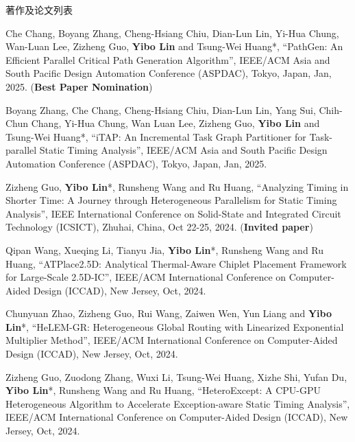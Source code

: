 \begin{rSection}{著作及论文列表}
\begin{description}[font=\normalfont, rightmargin=2em]
\item[{[C168]}]{
        Che Chang, Boyang Zhang, Cheng-Hsiang Chiu, Dian-Lun Lin, Yi-Hua Chung, Wan-Luan Lee, Zizheng Guo, \textbf{Yibo Lin} and Tsung-Wei Huang*, 
    ``PathGen: An Efficient Parallel Critical Path Generation Algorithm'', 
    IEEE/ACM Asia and South Pacific Design Automation Conference (ASPDAC), Tokyo, Japan, Jan, 2025.
    (\textbf{Best Paper Nomination})
}
            

\item[{[C167]}]{
        Boyang Zhang, Che Chang, Cheng-Hsiang Chiu, Dian-Lun Lin, Yang Sui, Chih-Chun Chang, Yi-Hua Chung, Wan Luan Lee, Zizheng Guo, \textbf{Yibo Lin} and Tsung-Wei Huang*, 
    ``iTAP: An Incremental Task Graph Partitioner for Task-parallel Static Timing Analysis'', 
    IEEE/ACM Asia and South Pacific Design Automation Conference (ASPDAC), Tokyo, Japan, Jan, 2025.
    
}
            

\item[{[C166]}]{
        Zizheng Guo, \textbf{Yibo Lin}*, Runsheng Wang and Ru Huang, 
    ``Analyzing Timing in Shorter Time: A Journey through Heterogeneous Parallelism for Static Timing Analysis'', 
    IEEE International Conference on Solid-State and Integrated Circuit Technology (ICSICT), Zhuhai, China, Oct 22-25, 2024.
    (\textbf{Invited paper})
}
            

\item[{[C165]}]{
        Qipan Wang, Xueqing Li, Tianyu Jia, \textbf{Yibo Lin}*, Runsheng Wang and Ru Huang, 
    ``ATPlace2.5D: Analytical Thermal-Aware Chiplet Placement Framework for Large-Scale 2.5D-IC'', 
    IEEE/ACM International Conference on Computer-Aided Design (ICCAD), New Jersey, Oct, 2024.
    
}
            

\item[{[C164]}]{
        Chunyuan Zhao, Zizheng Guo, Rui Wang, Zaiwen Wen, Yun Liang and \textbf{Yibo Lin}*, 
    ``HeLEM-GR: Heterogeneous Global Routing with Linearized Exponential Multiplier Method'', 
    IEEE/ACM International Conference on Computer-Aided Design (ICCAD), New Jersey, Oct, 2024.
    
}
            

\item[{[C163]}]{
        Zizheng Guo, Zuodong Zhang, Wuxi Li, Tsung-Wei Huang, Xizhe Shi, Yufan Du, \textbf{Yibo Lin}*, Runsheng Wang and Ru Huang, 
    ``HeteroExcept: A CPU-GPU Heterogeneous Algorithm to Accelerate Exception-aware Static Timing Analysis'', 
    IEEE/ACM International Conference on Computer-Aided Design (ICCAD), New Jersey, Oct, 2024.
    
}
\end{description}
\end{rSection}
